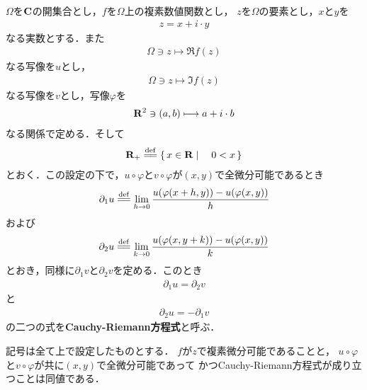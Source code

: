 	$\Omega$を$\mathbf{C}$の開集合とし，$f$を$\Omega$上の複素数値関数とし，
	$z$を$\Omega$の要素とし，$x$と$y$を
	\begin{align}
		z = x + i \cdot y
	\end{align}
	なる実数とする．また
	\begin{align}
		\Omega \ni z \longmapsto \Re{f(z)}
	\end{align}
	なる写像を$u$とし，
	\begin{align}
		\Omega \ni z \longmapsto \Im{f(z)}
	\end{align}
	なる写像を$v$とし，写像$\varphi$を
	\begin{align}
		\mathbf{R}^2 \ni (a,b) \longmapsto a + i \cdot b
	\end{align}
	なる関係で定める．そして
	\begin{align}
		\R_+ \defeq \Set{x \in \R}{0 < x}
	\end{align}
	とおく．この設定の下で，$u \circ \varphi$と$v \circ \varphi$が$(x,y)$で全微分可能であるとき
	\begin{align}
		\partial_1 u \defeq \lim_{h \to 0} \frac{u(\varphi(x+h,y)) - u(\varphi(x,y))}{h}
	\end{align}
	および
	\begin{align}
		\partial_2 u \defeq \lim_{k \to 0} \frac{u(\varphi(x,y+k)) - u(\varphi(x,y))}{k}
	\end{align}
	とおき，同様に$\partial_1 v$と$\partial_2 v$を定める．このとき
	\begin{align}
		\partial_1 u = \partial_2 v
	\end{align}
	と
	\begin{align}
		\partial_2 u = -\partial_1 v
	\end{align}
	の二つの式を{\bf Cauchy-Riemann方程式}と呼ぶ．
	
	
	\begin{screen}
		\begin{thm}
			記号は全て上で設定したものとする．
			$f$が$z$で複素微分可能であることと，
			$u \circ \varphi$と$v \circ \varphi$が共に$(x,y)$で全微分可能であって
			かつCauchy-Riemann方程式が成り立つことは同値である．
		\end{thm}
	\end{screen}
	
